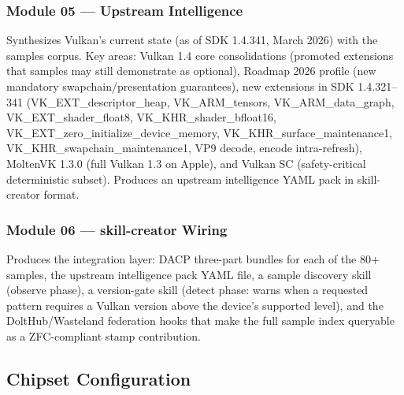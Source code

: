 \documentclass[11pt,letterpaper]{article}
\begin{document}
\subsubsection{Module 05 --- Upstream Intelligence}
Synthesizes Vulkan's current state (as of SDK 1.4.341, March 2026) with the samples corpus. Key areas: Vulkan 1.4 core consolidations (promoted extensions that samples may still demonstrate as optional), Roadmap 2026 profile (new mandatory swapchain/presentation guarantees), new extensions in SDK 1.4.321--341 (VK\_EXT\_descriptor\_heap, VK\_ARM\_tensors, VK\_ARM\_data\_graph, VK\_EXT\_shader\_float8, VK\_KHR\_shader\_bfloat16, VK\_EXT\_zero\_initialize\_device\_memory, VK\_KHR\_surface\_maintenance1, VK\_KHR\_swapchain\_maintenance1, VP9 decode, encode intra-refresh), MoltenVK 1.3.0 (full Vulkan 1.3 on Apple), and Vulkan SC (safety-critical deterministic subset). Produces an upstream intelligence YAML pack in skill-creator format.

\subsubsection{Module 06 --- skill-creator Wiring}
Produces the integration layer: DACP three-part bundles for each of the 80+ samples, the upstream intelligence pack YAML file, a sample discovery skill (observe phase), a version-gate skill (detect phase: warns when a requested pattern requires a Vulkan version above the device's supported level), and the DoltHub/Wasteland federation hooks that make the full sample index queryable as a ZFC-compliant stamp contribution.

\subsection{Chipset Configuration}
\end{document}
